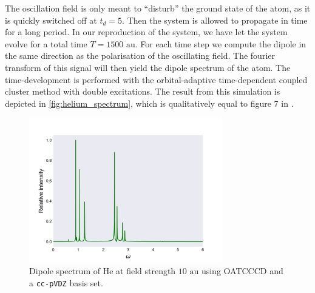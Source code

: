 The oscillation field is only meant to ``disturb'' the ground state of the atom,
as it is quickly 
switched off at $t_d=5$. Then the system is allowed to propagate in time for 
a long period. In our reproduction of the system, we have let the system 
evolve for a total time $T=1500 \text{ au}$. For each time step we compute the 
dipole in the same direction as the polarisation of the oscillating field. The 
fourier transform of this signal will then yield the dipole spectrum of the 
atom. The time-development is performed with the orbital-adaptive time-dependent 
coupled cluster method with double excitations. The result from this simulation is 
depicted in \autoref{fig:helium_spectrum}, which is qualitatively equal to figure 
7 in \citeauthor{pedersen2019symplectic}\cite{pedersen2019symplectic}.

\begin{figure}
    \centering
    \includegraphics[width=0.75\textwidth]{results/figures/helium_spectrum.png} 
    \caption{Dipole spectrum of He at field strength $10\text{ au}$ using 
        OATCCCD and a \lstinline{cc-pVDZ} basis set.      
    }
    \label{fig:helium_spectrum}
\end{figure}

